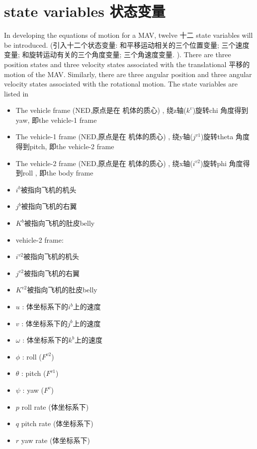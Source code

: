 \documentclass[UTF8,a4paper,10pt,nocolorlinks]{ctexart}
\begin{document}
\section{state variables 状态变量}

In developing the equations of motion for a MAV, 
twelve 十二 state variables will be introduced. 
(引入十二个状态变量: 
和平移运动相关的三个位置变量; 三个速度变量;
和旋转运动有关的三个角度变量; 三个角速度变量.
).
There are three position states and three velocity
states associated with the translational 平移的 motion 
of the MAV. Similarly,
there are three angular position and three angular velocity
states associated with the rotational motion. The state variables are listed in
\par 
\begin{itemize}
  \item The vehicle frame (NED,原点是在 机体的质心) , 绕z轴($k^{v}$)旋转chi 角度得到yaw, 即the vehicle-1 frame
  \item The vehicle-1 frame (NED,原点是在 机体的质心) , 绕y轴($j^{v1}$)旋转theta 角度得到pitch, 即the vehicle-2 frame
  \item The vehicle-2 frame (NED,原点是在 机体的质心) , 绕x轴($i^{v2}$)旋转phi 角度得到roll , 即the body frame
  \item $i^{b}$被指向飞机的机头
  \item $j^{b}$被指向飞机的右翼
  \item $K^{b}$被指向飞机的肚皮belly 
  \item vehicle-2 frame:  
  \item $i^{v2}$被指向飞机的机头
  \item $j^{v2}$被指向飞机的右翼
  \item $K^{v2}$被指向飞机的肚皮belly
  \item $u$ : 体坐标系下的$i^{b}$上的速度
  \item $v$ : 体坐标系下的$j^{b}$上的速度
  \item $\omega$ : 体坐标系下的$k^{b}$上的速度
  \item $\phi$ : roll ($F^{v2}$)
  \item $\theta$ : pitch ($F^{v1}$)
  \item $\psi$ : yaw ($F^{v}$)
  \item $p$ roll rate (体坐标系下)
  \item $q$ pitch rate (体坐标系下)
  \item $r$ yaw rate (体坐标系下)
  \label{table_3}
\end{itemize}
\end{document}
